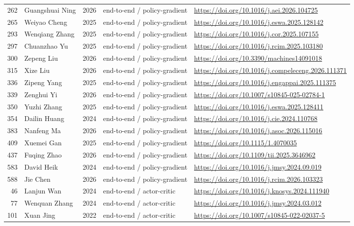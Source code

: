 \begin{longtable}{r p{3.0cm} r p{4.2cm} p{4.6cm}}
262 & Guangshuai Ning & 2026 & end-to-end / policy-gradient & \url{https://doi.org/10.1016/j.aei.2026.104725} \\
265 & Weiyao Cheng & 2025 & end-to-end / policy-gradient & \url{https://doi.org/10.1016/j.eswa.2025.128142} \\
293 & Wenqiang Zhang & 2025 & end-to-end / policy-gradient & \url{https://doi.org/10.1016/j.cor.2025.107155} \\
297 & Chuanzhao Yu & 2025 & end-to-end / policy-gradient & \url{https://doi.org/10.1016/j.rcim.2025.103180} \\
300 & Zepeng Liu & 2026 & end-to-end / policy-gradient & \url{https://doi.org/10.3390/machines14091018} \\
315 & Xize Liu & 2026 & end-to-end / policy-gradient & \url{https://doi.org/10.1016/j.compeleceng.2026.111371} \\
336 & Zipeng Yang & 2025 & end-to-end / policy-gradient & \url{https://doi.org/10.1016/j.engappai.2025.111375} \\
339 & Zenghui Yi & 2026 & end-to-end / policy-gradient & \url{https://doi.org/10.1007/s10845-025-02784-1} \\
350 & Yuzhi Zhang & 2025 & end-to-end / policy-gradient & \url{https://doi.org/10.1016/j.eswa.2025.128411} \\
354 & Dailin Huang & 2024 & end-to-end / policy-gradient & \url{https://doi.org/10.1016/j.cie.2024.110768} \\
383 & Nanfeng Ma & 2026 & end-to-end / policy-gradient & \url{https://doi.org/10.1016/j.asoc.2026.115016} \\
409 & Xuemei Gan & 2025 & end-to-end / policy-gradient & \url{https://doi.org/10.1115/1.4070035} \\
437 & Fuqing Zhao & 2026 & end-to-end / policy-gradient & \url{https://doi.org/10.1109/tii.2025.3646962} \\
583 & David Heik & 2024 & end-to-end / policy-gradient & \url{https://doi.org/10.1016/j.jmsy.2024.09.019} \\
588 & Jie Chen & 2026 & end-to-end / policy-gradient & \url{https://doi.org/10.1016/j.rcim.2026.103323} \\
46 & Lanjun Wan & 2024 & end-to-end / actor-critic & \url{https://doi.org/10.1016/j.knosys.2024.111940} \\
77 & Wenquan Zhang & 2024 & end-to-end / actor-critic & \url{https://doi.org/10.1016/j.jmsy.2024.03.012} \\
101 & Xuan Jing & 2022 & end-to-end / actor-critic & \url{https://doi.org/10.1007/s10845-022-02037-5} \\

\end{longtable}
